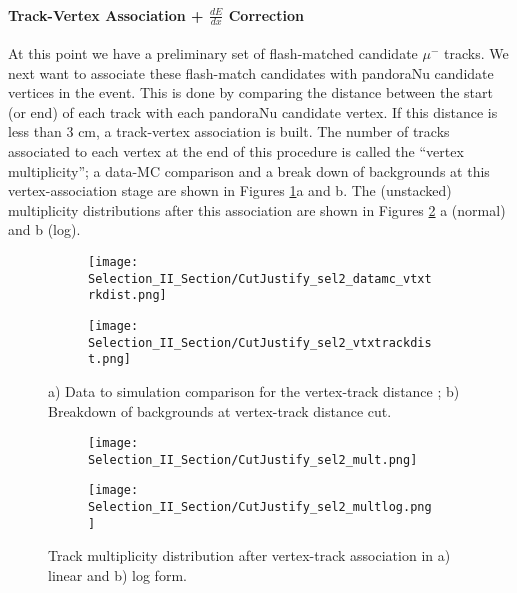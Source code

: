 \documentclass{article}
\begin{document}
\paragraph{Track-Vertex Association + $\frac{dE}{dx}$ Correction}
At this point we have a preliminary set of flash-matched candidate $\mu^-$ tracks. We next want to associate these flash-match candidates with pandoraNu candidate vertices in the event. This is done by comparing the distance between the start (or end) of each track with each pandoraNu candidate vertex. If this distance is less than 3 cm, a track-vertex association is built.  The number of tracks associated to each vertex at the end of this procedure is called the ``vertex multiplicity''; a data-MC comparison and a break down of backgrounds at this vertex-association stage are shown in Figures \ref{fig:cutjust_sel2_vtxtrackdist}a and b.  The (unstacked) multiplicity distributions after this association are shown in Figures \ref{fig:cutjust_sel2_mult} a (normal) and b (log).

\begin{figure}[h!]
\centering
  \begin{subfigure}[t]{0.4\textwidth}
    \centering
\texttt{[image: Selection\_II\_Section/CutJustify\_sel2\_datamc\_vtxtrkdist.png]}
    \caption{ }
  \end{subfigure} 
  \hspace{10 mm}
  \begin{subfigure}[t]{0.4\textwidth}
    \centering
\texttt{[image: Selection\_II\_Section/CutJustify\_sel2\_vtxtrackdist.png]}
    \caption{ }
  \end{subfigure} 
\caption{ a) Data to simulation comparison for the vertex-track distance ; b) Breakdown of backgrounds at vertex-track distance cut. }
\label{fig:cutjust_sel2_vtxtrackdist}
\end{figure}

\begin{figure}[h!]
\centering
  \begin{subfigure}[t]{0.4\textwidth}
    \centering
\texttt{[image: Selection\_II\_Section/CutJustify\_sel2\_mult.png]}
    \caption{ }
  \end{subfigure} 
  \hspace{10 mm}
  \begin{subfigure}[t]{0.4\textwidth}
    \centering
\texttt{[image: Selection\_II\_Section/CutJustify\_sel2\_multlog.png]}
    \caption{ }
  \end{subfigure} 
\caption{ Track multiplicity distribution after vertex-track association in a) linear and b) log form. }
\label{fig:cutjust_sel2_mult}
\end{figure}
\end{document}
